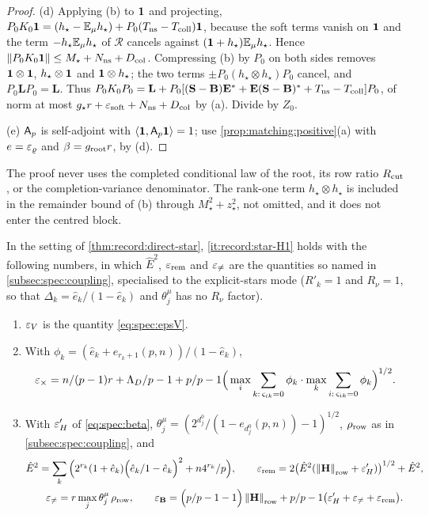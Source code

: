 \begin{proof}
(d) Applying (b) to $\mathbf 1$ and projecting,
$P_0K_0\mathbf 1=(h_\star-\mathbb E_\mu h_\star)+P_0(T_{\rm ns}-T_{\rm coll})\mathbf 1$, because the soft terms
vanish on $\mathbf 1$ and the term $-h_\star\mathbb E_\mu h_\star$ of $\mathcal R$ cancels against
$(\mathbf 1+h_\star)\mathbb E_\mu h_\star$. Hence $\left\|P_0K_0\mathbf 1\right\|\le M_\star+N_{\rm ns}+D_{\rm col}$.
Compressing (b) by $P_0$ on both sides removes $\mathbf 1\otimes\mathbf 1$, $h_\star\otimes\mathbf 1$ and
$\mathbf 1\otimes h_\star$; the two terms $\pm P_0(h_\star\otimes h_\star)P_0$ cancel, and
$P_0\mathbf LP_0=\mathbf L$. Thus
$P_0K_0P_0=\mathbf L+P_0[(\mathbf S-\mathbf B)\mathbf E^*+\mathbf E(\mathbf S-\mathbf B)^*+T_{\rm ns}-T_{\rm coll}]P_0$, of
norm at most $g_\star r+\varepsilon_{\rm soft}+N_{\rm ns}+D_{\rm col}$ by (a). Divide by $Z_0$.

(e) $\mathsf A_p$ is self-adjoint with $\left\langle \mathbf 1,\mathsf A_p\mathbf 1\right\rangle=1$; use
\cref{prop:matching:positive}(a) with $e=\varepsilon_\varrho$ and $\beta=g_{\rm root}r$, by (d).
\end{proof}

The proof never uses the completed conditional law of the root, its row ratio
$R_{\mathrm{cut}}$, or the completion-variance denominator. The rank-one term
$h_\star\otimes h_\star$ is included in the remainder bound of \textup{(b)} through $M_\star^2+z_\star^2$, not omitted, and it does not enter the centred
block.

\begin{lemma}\label{lem:record:frame-inputs}
In the setting of \cref{thm:record:direct-star},
\ref{it:record:star-H1} holds with the following numbers, in
which $\hat E^2$, $\varepsilon_{\rm rem}$ and $\varepsilon_{\ne}$ are the
quantities so named in \cref{subsec:spec:coupling}, specialised
to the explicit-stars mode ($R'_k=1$ and $R_\nu=1$, so that
$\Delta_k=\hat e_k/(1-\hat e_k)$ and $\theta^\mu_j$ has no $R_\nu$
factor).
\begin{enumerate}[label=\textup{(\roman*)}]
\item $\varepsilon_V$ is the quantity \eqref{eq:spec:epsV}.
\item With $\phi_k=(\hat e_k+e_{r_k+1}(p,n))/(1-\hat e_k)$,
  \[
    \varepsilon_\times=n/(p-1)r+\Lambda_D/p-1+p/p-1
    \Big(\max_i\sum_{k:\,\varsigma_{ik}=0}\phi_k\cdot\max_k\sum_{i:\,\varsigma_{ik}=0}\phi_k\Big)^{1/2}.
  \]
\item With $\varepsilon'_H$ of \eqref{eq:spec:beta},
  $\theta^\mu_j=(2^{d^0_j}/(1-e_{d^0_j}(p,n))-1)^{1/2}$, $\rho_{\rm row}$ as in
  \cref{subsec:spec:coupling}, and
  \begin{gather*}
    \hat E^2=\sum_k\Big(2^{r_k}(1+\hat e_k)\Big(\hat e_k/1-\hat e_k\Big)^2+n4^{r_k}/p\Big),
    \qquad
    \varepsilon_{\rm rem}=2\big(\hat E^2(\left\|\mathbf H\right\|_{\rm row}+\varepsilon'_H)\big)^{1/2}+\hat E^2,\\
    \varepsilon_{\ne}=r\max_j\theta^\mu_j\,\rho_{\rm row},\qquad
    \varepsilon_{\mathbf B}=\Big(p/p-1-1\Big)\left\|\mathbf H\right\|_{\rm row}+p/p-1\big(\varepsilon'_H+\varepsilon_{\ne}+\varepsilon_{\rm rem}\big).
  \end{gather*}
\end{enumerate}
\end{lemma}


